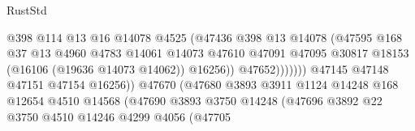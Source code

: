 \begin{lexlean}{RustStd}
\begin{coremodule}
                                                @398
                                                @114
                                                @13
                                                @16
                                                @14078
                                                @4525
                                                (@47436
                                                  @398
                                                  @13
                                                  @14078
                                                  (@47595
                                                    @168
                                                    @37
                                                    @13
                                                    @4960
                                                    @4783
                                                    @14061
                                                    @14073
                                                    @47610
                                                    @47091
                                                    @47095
                                                    @30817
                                                    @18153
                                                    (@16106 (@19636 @14073 @14062))
                                                    @16256))
                                                @47652)))))))
                                  @47145
                                  @47148
                                  @47151
                                  @47154
                                  @16256))
                              @47670
                              (@47680
                                @3893
                                @3911
                                @1124
                                @14248
                                @168
                                @12654
                                @4510
                                @14568
                                (@47690
                                  @3893
                                  @3750
                                  @14248
                                  (@47696
                                    @3892
                                    @22
                                    @3750
                                    @4510
                                    @14246
                                    @4299
                                    @4056
                                    (@47705

\end{coremodule}
\end{lexlean}
